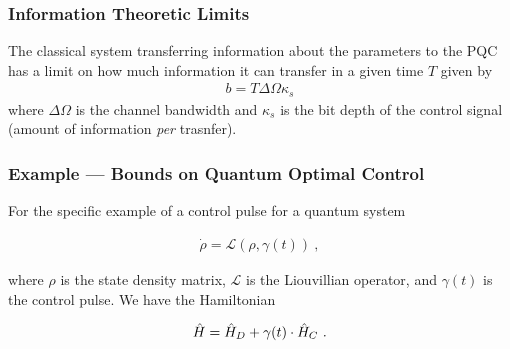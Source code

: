 
\begin{frame}
    \frametitle{Information Theoretic Limits}

    
    \begin{multicols}{2}
        
        \begin{figure}
        \end{figure}
        The classical system transferring information about the parameters to
        the PQC has a limit on how much information it can transfer in a given
        time \(T\) given by
        \begin{gather*}
            b = T\Delta\Omega\kappa_s
        \end{gather*}
        where \(\Delta\Omega\) is the channel bandwidth and \(\kappa_s\) is the
        bit depth of the control signal (amount of information \emph{per}
        trasnfer).
    \end{multicols}

\end{frame}

\begin{frame}
    \frametitle{Example --- Bounds on Quantum Optimal Control}

    For the specific example of a control pulse for a quantum system
    \cite{lloyd2014information}

    \begin{gather*}
        \dot{\rho} = \mathcal{L}(\rho, \gamma(t))~,
    \end{gather*}

    where \(\rho\) is the state density matrix, \(\mathcal{L}\) is the
    Liouvillian operator, and \(\gamma(t)\) is the control pulse. We have the
    Hamiltonian

    \begin{gather*}
        \hat{H} = \hat{H}_D + \gamma(t)\cdot \hat{H}_C~.
    \end{gather*}

\end{frame}

